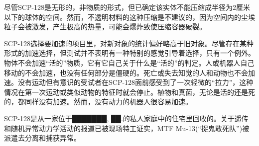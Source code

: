 尽管SCP-128是无形的，非物质的形式，但已确定该实体不能压缩成半径为2厘米以下的球体的空间。然而，不透明材料的这种压缩是不建议的，因为空间内的尘埃粒子会被激发，产生极高的热量，可能会爆炸致使压缩容器破裂。

SCP-128选择要加速的项目里，对新对象的统计偏好略高于旧对象。尽管存在某种形式的加速选择，但测试并不表明有一种特别的感觉引导着选择，只有一个例外。物体不会加速“活的”物质，它有它自己关于什么是“活的”的判定。人或机器人自己移动的不会加速，也没有任何部分是僵硬的。死亡或失去知觉的人和动物也不会加速。没有运动但有意识的受试者在SCP-128面前感受到了一次轻微的“拉力”，这种情况在第一次运动或类似动物的特征时就会停止。植物和真菌，无论是活的还是死的，都同样没有加速。然而，没有动力的机器人很容易加速。


SCP-128是从一家位于███████, ██.的私人家庭中的住宅里回收的。关于遥传和随机异常动力学活动的报道已被现场特工证实，MTF Mu-13(“捉鬼敢死队”)被派遣去分离和捕获异常。

